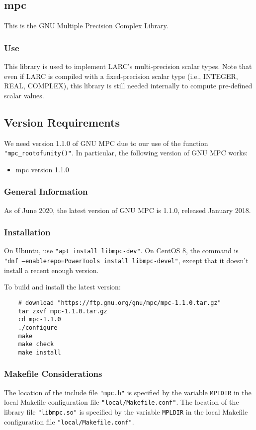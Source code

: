 \documentclass{article}
\begin{document}
\subsection{mpc}
This is the GNU Multiple Precision Complex Library.
\subsubsection{Use}
This library is used to implement LARC's multi-precision
scalar types.
Note that even if LARC is compiled with a fixed-precision
scalar type (i.e., INTEGER, REAL, COMPLEX), this library
is still needed internally to compute pre-defined scalar
values.
\subsection{Version Requirements}
We need version 1.1.0 of GNU MPC due to our use of
the function {\tt "mpc\_rootofunity()"}.
In particular, the following version of GNU MPC works:
\begin{itemize}
\item mpc version 1.1.0
\end{itemize}
\subsubsection{General Information}
As of June 2020, the latest version of GNU MPC is 1.1.0,
released January 2018.
\subsubsection{Installation}
On Ubuntu, use {\tt "apt install libmpc-dev"}.
On CentOS 8, the command is {\tt "dnf --enablerepo=PowerTools install libmpc-devel"},
except that it doesn't install a recent enough version.

\medskip
\noindent
To build and install the latest version:
\begin{verbatim}
    # download "https://ftp.gnu.org/gnu/mpc/mpc-1.1.0.tar.gz"
    tar zxvf mpc-1.1.0.tar.gz
    cd mpc-1.1.0
    ./configure
    make
    make check
    make install
\end{verbatim}
\subsubsection{Makefile Considerations}
The location of the include file \texttt{"mpc.h"}
is specified by the variable \texttt{MPIDIR} in the
local Makefile configuration file \texttt{"local/Makefile.conf"}.
The location of the library file \texttt{"libmpc.so"}
is specified by the variable \texttt{MPLDIR} in the
local Makefile configuration file \texttt{"local/Makefile.conf"}.
\end{document}
